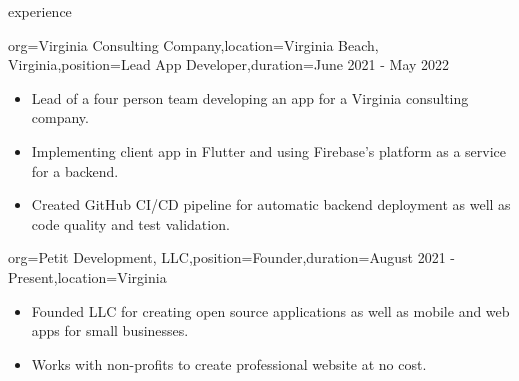 \documentclass{resume}
\begin{document}
\begin{ResumeSection}{experience}
    \begin{ResumeSubsection}{org={Virginia Consulting
        Company},location={Virginia Beach, Virginia},position={Lead App
    Developer},duration={June 2021 - May 2022}}
        \begin{itemize}
            \item {Lead of a four person team developing an app for a Virginia consulting company.}
            \item {Implementing client app in Flutter and using Firebase's platform as a service for a backend.}
            \item {Created GitHub CI/CD pipeline for automatic backend deployment as well as code quality and test validation.}
        \end{itemize}
    \end{ResumeSubsection}


    \begin{ResumeSubsection}{org={Petit Development, LLC},position={Founder},duration={August 2021 - Present},location={Virginia}}
        \begin{itemize}
            \item Founded LLC for creating open source applications as well as
                mobile and web apps for small businesses.
            \item Works with non-profits to create professional website at no cost.
        \end{itemize}
    \end{ResumeSubsection}

\end{ResumeSection}
\end{document}

